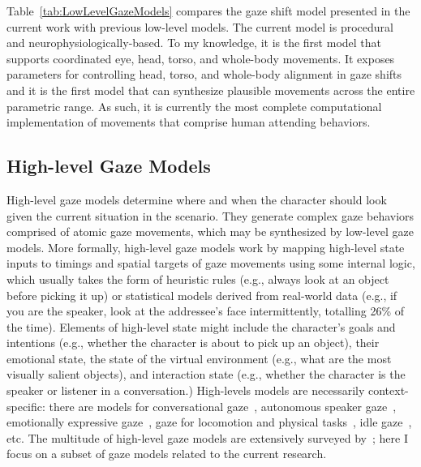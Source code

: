 Table~\ref{tab:LowLevelGazeModels} compares the gaze shift model presented in the current work with previous low-level models. The current model is procedural and neurophysiologically-based. To my knowledge, it is the first model that supports coordinated eye, head, torso, and whole-body movements. It exposes parameters for controlling head, torso, and whole-body alignment in gaze shifts and it is the first model that can synthesize plausible movements across the entire parametric range. %
As such, it is currently the most complete computational implementation of movements that comprise human attending behaviors.

\subsection{High-level Gaze Models}

High-level gaze models determine where and when the character should look given the current situation in the scenario. They generate complex gaze behaviors comprised of atomic gaze movements, which may be synthesized by low-level gaze models. More formally, high-level gaze models work by mapping high-level state inputs to timings and spatial targets of gaze movements using some internal logic, which usually takes the form of heuristic rules (e.g., always look at an object before picking it up) or statistical models derived from real-world data (e.g., if you are the speaker, look at the addressee's face intermittently, totalling 26\% of the time). Elements of high-level state might include the character's goals and intentions (e.g., whether the character is about to pick up an object), their emotional state, the state of the virtual environment (e.g., what are the most visually salient objects), and interaction state (e.g., whether the character is the speaker or listener in a conversation.) High-levels models are necessarily context-specific: there are models for conversational gaze~\citep{pelachaud2003modelling,masuko2007headeye,gratch2007rapport,andrist2013aversion,lee2007rickel}, autonomous speaker gaze~\citep{bee2010gaze,zoric2011oncreating,marsella2013virtual}, emotionally expressive gaze~\citep{queiroz2007automatic,lance2010expressive,li2012emotional}, gaze for locomotion and physical tasks~\citep{khullar2001look,mitake2007reactive,huang2016planning}, idle gaze~\citep{khullar2001look,peters2003bottomup,mitake2007reactive,peters2008applying,cafaro2009animating,grillon2009crowds,kokkinara2011modelling}, etc. The multitude of high-level gaze models are extensively surveyed by~\citet{ruhland2015gazereview}; here I focus on a subset of gaze models related to the current research.

